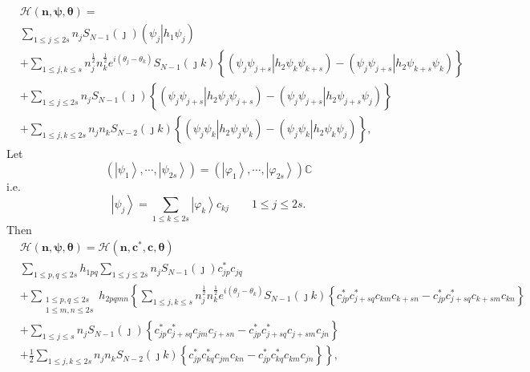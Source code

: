 \documentclass[aps,preprint]{revtex4}%
\begin{document}
\begin{align}
&  \mathcal{H}\left(  \mathbf{n},\mathbf{\psi},\mathbf{\theta}\right)
=\nonumber\\
&  \sum_{1\leq j\leq2s}n_{j}S_{N-1}\left(  \jmath\right)  \left(  \left.
\psi_{j}\right\vert h_{1}\psi_{j}\right)  \nonumber\\
&  +\sum_{1\leq j,k\leq s}n_{j}^{\frac{1}{2}}n_{k}^{\frac{1}{2}}e^{i\left(
\theta_{j}-\theta_{k}\right)  }S_{N-1}\left(  \jmath k\right)  \left\{
\overset{}{\left(  \left.  \psi_{j}\psi_{j+s}\right\vert h_{2}\psi_{k}%
\psi_{k+s}\right)  -\left(  \left.  \psi_{j}\psi_{j+s}\right\vert h_{2}%
\psi_{k+s}\psi_{k}\right)  }\right\}  \nonumber\\
&  +\sum_{1\leq j\leq2s}n_{j}S_{N-1}\left(  \jmath\right)  \left\{  \overset
{}{\left(  \left.  \psi_{j}\psi_{j+s}\right\vert h_{2}\psi_{j}\psi
_{j+s}\right)  -\left(  \left.  \psi_{j}\psi_{j+s}\right\vert h_{2}\psi
_{j+s}\psi_{j}\right)  }\right\}  \\
&  +\sum_{1\leq j,k\leq2s}n_{j}n_{k}S_{N-2}\left(  \jmath k\right)  \left\{
\overset{}{\left(  \left.  \psi_{j}\psi_{k}\right\vert h_{2}\psi_{j}\psi
_{k}\right)  -\left(  \left.  \psi_{j}\psi_{k}\right\vert h_{2}\psi_{k}%
\psi_{j}\right)  }\right\}  ,\label{unnormE}%
\end{align}
Let
\begin{equation}
\left(  \left\vert \psi_{1}\right\rangle ,\cdots,\left\vert \psi
_{2s}\right\rangle \right)  =\left(  \left\vert \varphi_{1}\right\rangle
,\cdots,\left\vert \varphi_{2s}\right\rangle \right)  \mathbb{C}%
\end{equation}
i.e.
\begin{equation}
\left\vert \psi_{j}\right\rangle =\sum_{1\leq k\leq2s}\left\vert \varphi
_{k}\right\rangle c_{kj}\qquad1\leq j\leq2s.
\end{equation}
Then
\begin{align}
&  \mathcal{H}\left(  \mathbf{n},\mathbf{\psi},\mathbf{\theta}\right)
=\mathcal{H}\left(  \mathbf{n},\mathbf{c}^{\ast}\mathbf{,c},\mathbf{\theta
}\right)  \nonumber\\
&  \sum_{1\leq p,q\leq2s}h_{1pq}\sum_{1\leq j\leq2s}n_{j}S_{N-1}\left(
\jmath\right)  c_{jp}^{\ast}c_{jq}\nonumber\\
&  +\sum_{\substack{1\leq p,q\leq2s\\1\leq m,n\leq2s}}h_{2pqmn}\left\{
\sum_{1\leq j,k\leq s}n_{j}^{\frac{1}{2}}n_{k}^{\frac{1}{2}}e^{i\left(
\theta_{j}-\theta_{k}\right)  }S_{N-1}\left(  \jmath k\right)  \left\{
\overset{}{c_{jp}^{\ast}c_{j+sq}^{\ast}c_{km}c_{k+sn}-c_{jp}^{\ast}%
c_{j+sq}^{\ast}c_{k+sm}c_{kn}}\right\}  \right.  \\
&  +\sum_{1\leq j\leq s}n_{j}S_{N-1}\left(  \jmath\right)  \left\{  \overset
{}{c_{jp}^{\ast}c_{j+sq}^{\ast}c_{jm}c_{j+sn}-c_{jp}^{\ast}c_{j+sq}^{\ast
}c_{j+sm}c_{jn}}\right\}  \\
&  +\left.  \frac{1}{2}\sum_{1\leq j,k\leq2s}n_{j}n_{k}S_{N-2}\left(  \jmath
k\right)  \left\{  \overset{}{c_{jp}^{\ast}c_{kq}^{\ast}c_{jm}c_{kn}%
-c_{jp}^{\ast}c_{kq}^{\ast}c_{km}c_{jn}}\right\}  \right\}  ,
\end{align}
\end{document}
